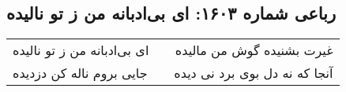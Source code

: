 \begin{center}
\section*{رباعی شماره ۱۶۰۳: ای بی‌ادبانه من ز تو نالیده}
\label{sec:1603}
\begin{longtable}{l p{0.5cm} r}
ای بی‌ادبانه من ز تو نالیده
&&
غیرت بشنیده گوش من مالیده
\\
جایی بروم ناله کن دزدیده
&&
آنجا که نه دل بوی برد نی دیده
\\
\end{longtable}
\end{center}
